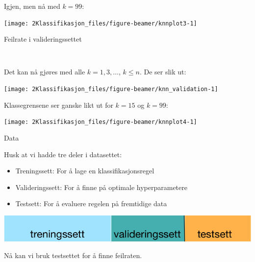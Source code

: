 \documentclass[10pt,ignorenonframetext,]{beamer}
\providecommand{\tightlist}{%
  \setlength{\itemsep}{0pt}\setlength{\parskip}{0pt}}
\begin{document}
\begin{frame}

Igjen, men nå med \(k=99\):

\begin{center}\texttt{[image: 2Klassifikasjon\_files/figure-beamer/knnplot3-1]} \end{center}

\end{frame}

\begin{frame}

\begin{block}{Feilrate i valideringssettet}

\(~\)

Det kan nå gjøres med alle \(k=1,3,\ldots\), \(k\leq n\). De ser slik
ut:

\vspace{5mm}

\begin{center}\texttt{[image: 2Klassifikasjon\_files/figure-beamer/knn\_validation-1]} \end{center}

\end{block}

\end{frame}

\begin{frame}

Klassegrensene ser ganske likt ut for \(k=15\) og \(k=99\):

\begin{center}\texttt{[image: 2Klassifikasjon\_files/figure-beamer/knnplot4-1]} \end{center}

\end{frame}

\begin{frame}{Data}
\protect\hypertarget{data-1}{}

\vspace{2mm}

Husk at vi hadde tre deler i datasettet:

\vspace{2mm}

\begin{itemize}
\tightlist
\item
  Treningssett: For å lage en klassifikasjonsregel
\item
  Valideringssett: For å finne på optimale hyperparametere
\item
  Testsett: For å evaluere regelen på fremtidige data
\end{itemize}

\vspace{5mm}

\includegraphics{datasett.png}

\vspace{2mm}

Nå kan vi bruk testsettet for å finne feilraten.

\end{frame}
\end{document}
